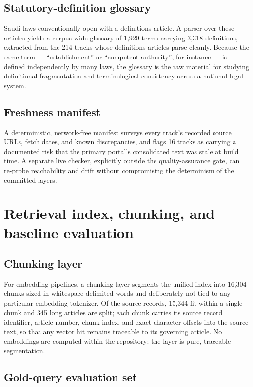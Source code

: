 \documentclass[sn-basic]{sn-jnl}%
\begin{document}
\subsection{Statutory-definition glossary}

Saudi laws conventionally open with a definitions article. A parser over
these articles yields a corpus-wide glossary of 1{,}920 terms carrying
3{,}318 definitions, extracted from the 214 tracks whose definitions
articles parse cleanly. Because the same term --- ``establishment'' or
``competent authority'', for instance --- is defined independently by many
laws, the glossary is the raw material for studying definitional
fragmentation and terminological consistency across a national legal system.

\subsection{Freshness manifest}

A deterministic, network-free manifest surveys every track's recorded source
URLs, fetch dates, and known discrepancies, and flags 16 tracks as carrying
a documented risk that the primary portal's consolidated text was stale at
build time. A separate live checker, explicitly outside the quality-assurance
gate, can re-probe reachability and drift without compromising the
determinism of the committed layers.

\section{Retrieval index, chunking, and baseline evaluation}
\label{sec:retrieval}

\subsection{Chunking layer}

For embedding pipelines, a chunking layer segments the unified index into
16{,}304 chunks sized in whitespace-delimited words and deliberately not
tied to any particular embedding tokenizer. Of the source records, 15{,}344
fit within a single chunk and 345 long articles are split; each chunk
carries its source record identifier, article number, chunk index, and exact
character offsets into the source text, so that any vector hit remains
traceable to its governing article. No embeddings are computed within the
repository: the layer is pure, traceable segmentation.

\subsection{Gold-query evaluation set}
\end{document}
